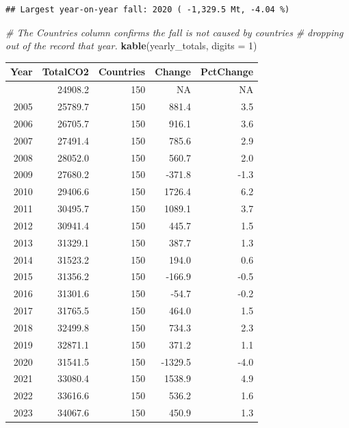 \documentclass[
]{article}
\newenvironment{Shaded}{\begin{snugshade}}{\end{snugshade}}
\newcommand{\AttributeTok}[1]{\textcolor[rgb]{0.13,0.29,0.53}{#1}}
\newcommand{\CommentTok}[1]{\textcolor[rgb]{0.56,0.35,0.01}{\textit{#1}}}
\newcommand{\DecValTok}[1]{\textcolor[rgb]{0.00,0.00,0.81}{#1}}
\newcommand{\FunctionTok}[1]{\textcolor[rgb]{0.13,0.29,0.53}{\textbf{#1}}}
\newcommand{\NormalTok}[1]{#1}
\newcounter{none} %
\begin{document}
\begin{verbatim}
## Largest year-on-year fall: 2020 ( -1,329.5 Mt, -4.04 %)
\end{verbatim}

\begin{Shaded}
\begin{Highlighting}[]
\CommentTok{\# The Countries column confirms the fall is not caused by countries}
\CommentTok{\# dropping out of the record that year.}
\FunctionTok{kable}\NormalTok{(yearly\_totals, }\AttributeTok{digits =} \DecValTok{1}\NormalTok{)}
\end{Highlighting}
\end{Shaded}

{\def\LTcaptype{none} %
\begin{longtable}[]{@{}rrrrr@{}}
\toprule\noalign{}
Year & TotalCO2 & Countries & Change & PctChange \\
\midrule\noalign{}
\endhead
\bottomrule\noalign{}
\endlastfoot
2004 & 24908.2 & 150 & NA & NA \\
2005 & 25789.7 & 150 & 881.4 & 3.5 \\
2006 & 26705.7 & 150 & 916.1 & 3.6 \\
2007 & 27491.4 & 150 & 785.6 & 2.9 \\
2008 & 28052.0 & 150 & 560.7 & 2.0 \\
2009 & 27680.2 & 150 & -371.8 & -1.3 \\
2010 & 29406.6 & 150 & 1726.4 & 6.2 \\
2011 & 30495.7 & 150 & 1089.1 & 3.7 \\
2012 & 30941.4 & 150 & 445.7 & 1.5 \\
2013 & 31329.1 & 150 & 387.7 & 1.3 \\
2014 & 31523.2 & 150 & 194.0 & 0.6 \\
2015 & 31356.2 & 150 & -166.9 & -0.5 \\
2016 & 31301.6 & 150 & -54.7 & -0.2 \\
2017 & 31765.5 & 150 & 464.0 & 1.5 \\
2018 & 32499.8 & 150 & 734.3 & 2.3 \\
2019 & 32871.1 & 150 & 371.2 & 1.1 \\
2020 & 31541.5 & 150 & -1329.5 & -4.0 \\
2021 & 33080.4 & 150 & 1538.9 & 4.9 \\
2022 & 33616.6 & 150 & 536.2 & 1.6 \\
2023 & 34067.6 & 150 & 450.9 & 1.3 \\
\end{longtable}
}
\end{document}
